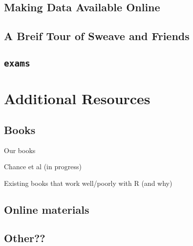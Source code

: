 \section{Making Data Available Online}


\section{A Breif Tour of Sweave and Friends}

\section{\texttt{exams}}

\chapter{Additional Resources}

\section{Books}

Our books

Chance et al (in progress)

Existing books that work well/poorly with R (and why)

\section{Online materials}

\section{Other??}
